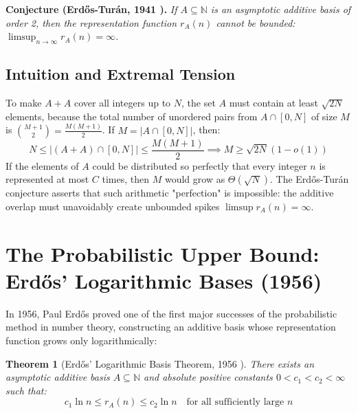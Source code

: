 \documentclass[11pt,a4paper]{article}
\newtheorem{theorem}{Theorem}[section]
\theoremstyle{definition}
\begin{document}
\noindent\textbf{Conjecture (Erd\H{o}s-Tur\'an, 1941 \cite{erdos1941}).} \textit{If $A \subseteq \mathbb{N}$ is an asymptotic additive basis of order 2, then the representation function $r_A(n)$ cannot be bounded: $\limsup_{n \to \infty} r_A(n) = \infty$.}

\subsection{Intuition and Extremal Tension}
To make $A + A$ cover all integers up to $N$, the set $A$ must contain at least $\sqrt{2N}$ elements, because the total number of unordered pairs from $A \cap [0, N]$ of size $M$ is $\binom{M+1}{2} = \frac{M(M+1)}{2}$.
If $M = |A \cap [0, N]|$, then:
\[ N \le |(A + A) \cap [0, N]| \le \frac{M(M+1)}{2} \implies M \ge \sqrt{2N} (1 - o(1)) \]
If the elements of $A$ could be distributed so perfectly that every integer $n$ is represented at most $C$ times, then $M$ would grow as $\Theta(\sqrt{N})$.
The Erd\H{o}s-Tur\'an conjecture asserts that such arithmetic "perfection" is impossible: the additive overlap must unavoidably create unbounded spikes $\limsup r_A(n) = \infty$.

\section{The Probabilistic Upper Bound: Erd\H{o}s' Logarithmic Bases (1956)}

In 1956, Paul Erd\H{o}s \cite{erdos1956} proved one of the first major successes of the probabilistic method in number theory, constructing an additive basis whose representation function grows only logarithmically:

\begin{theorem}[Erd\H{o}s' Logarithmic Basis Theorem, 1956 \cite{erdos1956}]\label{thm:erdos_log}
There exists an asymptotic additive basis $A \subseteq \mathbb{N}$ and absolute positive constants $0 < c_1 < c_2 < \infty$ such that:
\begin{equation}\label{eq:erdos_log_bound}
c_1 \ln n \le r_A(n) \le c_2 \ln n \quad \text{for all sufficiently large } n
\end{equation}
\end{theorem}
\end{document}
